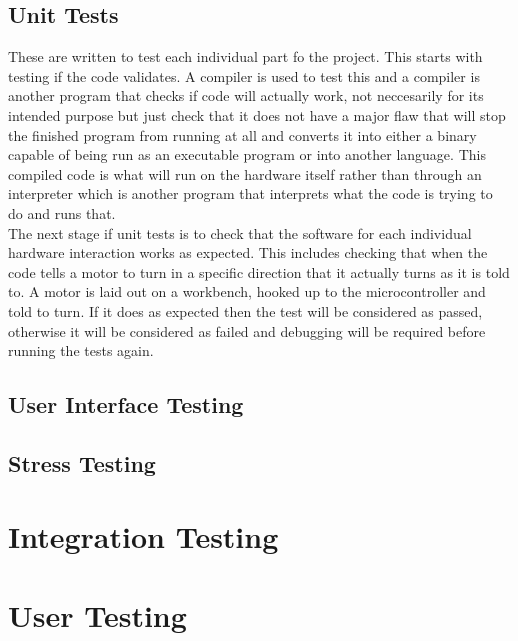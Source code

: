 \subsection{Unit Tests}
These are written to test each individual part fo the project.  This starts with testing if the code validates.  A compiler is used to test this and a compiler is another program that checks if code will actually work, not neccesarily for its intended purpose but just check that it does not have a major flaw that will stop the finished program from running at all and converts it into either a binary capable of being run as an executable program or into another language.  This compiled code is what will run on the hardware itself rather than through an interpreter which is another program that interprets what the code is trying to do and runs that.
\\The next stage if unit tests is to check that the software for each individual hardware interaction works as expected.  This includes checking that when the code tells a motor to turn in a specific direction that it actually turns as it is told to.  A motor is laid out on a workbench, hooked up to the microcontroller and told to turn.  If it does as expected then the test will be considered as passed, otherwise it will be considered as failed and debugging will be required before running the tests again.
\subsection{User Interface Testing}

\subsection{Stress Testing}

\section{Integration Testing}

\section{User Testing}
